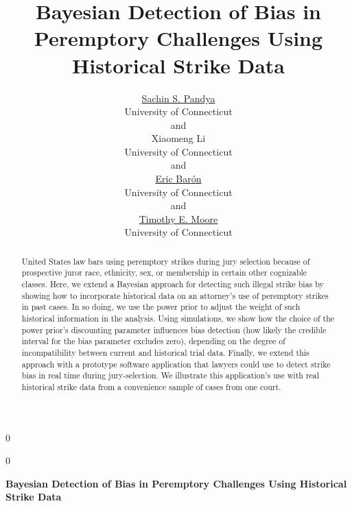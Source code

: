 \documentclass[12pt]{article}
\newcommand{\blind}{0}
\begin{document}
\def\spacingset#1{\renewcommand{\baselinestretch}%
{#1}\small\normalsize} \spacingset{1}



\blind
{
  \title{\bf Bayesian Detection of Bias in Peremptory Challenges Using Historical Strike Data}

  \author{
        \href{https://orcid.org/0000-0001-7387-1307}{Sachin S. Pandya} \\
    University of Connecticut\\
     and \\     Xiaomeng Li \\
    University of Connecticut\\
     and \\     \href{https://orcid.org/0000-0003-1934-1932}{Eric Barón} \\
    University of Connecticut\\
     and \\     \href{https://orcid.org/0000-0002-9576-0517}{Timothy E. Moore} \\
    University of Connecticut\\
      }
  \maketitle
} \fi

\blind
{
  \bigskip
  \bigskip
  \bigskip
  \begin{center}
    {\LARGE\bf Bayesian Detection of Bias in Peremptory Challenges Using Historical Strike Data}
  \end{center}
  \medskip
} \fi

\bigskip
\begin{abstract}
United States law bars using peremptory strikes during jury selection because of prospective juror race, ethnicity, sex, or membership in certain other cognizable classes. Here, we extend a Bayesian approach for detecting such illegal strike bias by showing how to incorporate historical data on an attorney's use of peremptory strikes in past cases. In so doing, we use the power prior to adjust the weight of such historical information in the analysis. Using simulations, we show how the choice of the power prior's discounting parameter influences bias detection (how likely the credible interval for the bias parameter excludes zero), depending on the degree of incompatibility between current and historical trial data. Finally, we extend this approach with a prototype software application that lawyers could use to detect strike bias in real time during jury-selection. We illustrate this application's use with real historical strike data from a convenience sample of cases from one court.
\end{abstract}
\end{document}
